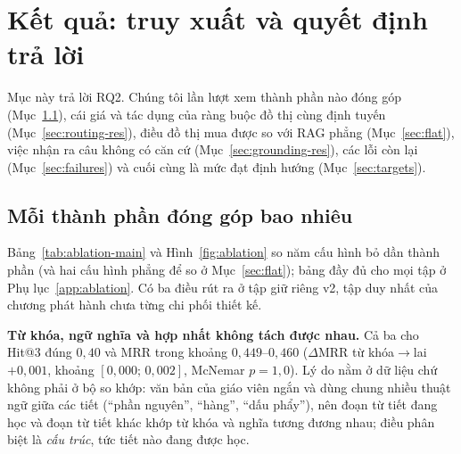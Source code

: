 \section{Kết quả: truy xuất và quyết định trả lời}\label{sec:res-rag}

Mục này trả lời RQ2. Chúng tôi lần lượt xem thành phần nào đóng góp (Mục~\ref{sec:ablation}), cái giá và tác dụng của ràng buộc đồ thị cùng định tuyến (Mục~\ref{sec:routing-res}), điều đồ thị mua được so với RAG phẳng (Mục~\ref{sec:flat}), việc nhận ra câu không có căn cứ (Mục~\ref{sec:grounding-res}), các lỗi còn lại (Mục~\ref{sec:failures}) và cuối cùng là mức đạt định hướng (Mục~\ref{sec:targets}).

\subsection{Mỗi thành phần đóng góp bao nhiêu}\label{sec:ablation}
Bảng~\ref{tab:ablation-main} và Hình~\ref{fig:ablation} so năm cấu hình bỏ dần thành phần (và hai cấu hình phẳng để so ở Mục~\ref{sec:flat}); bảng đầy đủ cho mọi tập ở Phụ lục~\ref{app:ablation}. Có ba điều rút ra ở tập giữ riêng v2, tập duy nhất của chương phát hành chưa từng chi phối thiết kế.

\textbf{Từ khóa, ngữ nghĩa và hợp nhất không tách được nhau.} Cả ba cho Hit@3 đúng $0{,}40$ và MRR trong khoảng $0{,}449$--$0{,}460$ ($\Delta$MRR từ khóa$\to$lai $+0{,}001$, khoảng $[0{,}000;\,0{,}002]$, McNemar $p=1{,}0$). Lý do nằm ở dữ liệu chứ không phải ở bộ so khớp: văn bản của giáo viên ngắn và dùng chung nhiều thuật ngữ giữa các tiết (``phần nguyên'', ``hàng'', ``dấu phẩy''), nên đoạn từ tiết đang học và đoạn từ tiết khác khớp từ khóa và nghĩa tương đương nhau; điều phân biệt là \emph{cấu trúc}, tức tiết nào đang được học.

